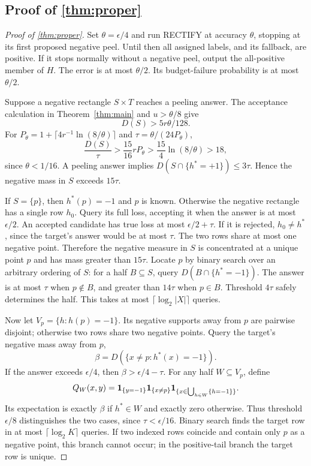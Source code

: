 \subsection[Proof of result proper]{Proof of \cref{thm:proper}}\label{proof:proper}
\begin{proof}[Proof of \cref{thm:proper}]
Set $\theta=\epsilon/4$ and run RECTIFY at accuracy $\theta$, stopping at its first proposed negative peel. Until then all assigned labels, and its fallback, are positive. If it stops normally without a negative peel, output the all-positive member of $H$. The error is at most $\theta/2$. Its budget-failure probability is at most $\theta/2$.

Suppose a negative rectangle $S\times T$ reaches a peeling answer. The acceptance calculation in Theorem~\ref{thm:main} and $u>\theta/8$ give
\[
 D(S)>5r\theta/128.
\]
For $P_\theta=1+\lceil4r^{-1}\ln(8/\theta)\rceil$ and $\tau=\theta/(24P_\theta)$,
\[
 \frac{D(S)}\tau>\frac{15}{16}rP_\theta
 >\frac{15}{4}\ln(8/\theta)>18,
\]
since $\theta<1/16$. A peeling answer implies $D(S\cap\{h^*=+1\})\le3\tau$. Hence the negative mass in $S$ exceeds $15\tau$.

If $S=\{p\}$, then $h^*(p)=-1$ and $p$ is known. Otherwise the negative rectangle has a single row $h_0$. Query its full loss, accepting it when the answer is at most $\epsilon/2$. An accepted candidate has true loss at most $\epsilon/2+\tau$. If it is rejected, $h_0\ne h^*$, since the target's answer would be at most $\tau$. The two rows share at most one negative point. Therefore the negative measure in $S$ is concentrated at a unique point $p$ and has mass greater than $15\tau$. Locate $p$ by binary search over an arbitrary ordering of $S$: for a half $B\subseteq S$, query $D(B\cap\{h^*=-1\})$. The answer is at most $\tau$ when $p\notin B$, and greater than $14\tau$ when $p\in B$. Threshold $4\tau$ safely determines the half. This takes at most $\lceil\log_2|X|\rceil$ queries.

Now let $V_p=\{h:h(p)=-1\}$. Its negative supports away from $p$ are pairwise disjoint; otherwise two rows share two negative points. Query the target's negative mass away from $p$,
\[
 \beta=D(\{x\ne p:h^*(x)=-1\}).
\]
If the answer exceeds $\epsilon/4$, then $\beta>\epsilon/4-\tau$. For any half $W\subseteq V_p$, define
\[
 Q_W(x,y)=\mathbf 1_{\{y=-1\}}\mathbf 1_{\{x\ne p\}}
 \mathbf 1_{\{x\in\bigcup_{h\in W}\{h=-1\}\}}.
\]
Its expectation is exactly $\beta$ if $h^*\in W$ and exactly zero otherwise. Thus threshold $\epsilon/8$ distinguishes the two cases, since $\tau<\epsilon/16$. Binary search finds the target row in at most $\lceil\log_2K\rceil$ queries. If two indexed rows coincide and contain only $p$ as a negative point, this branch cannot occur; in the positive-tail branch the target row is unique.


\end{proof}
